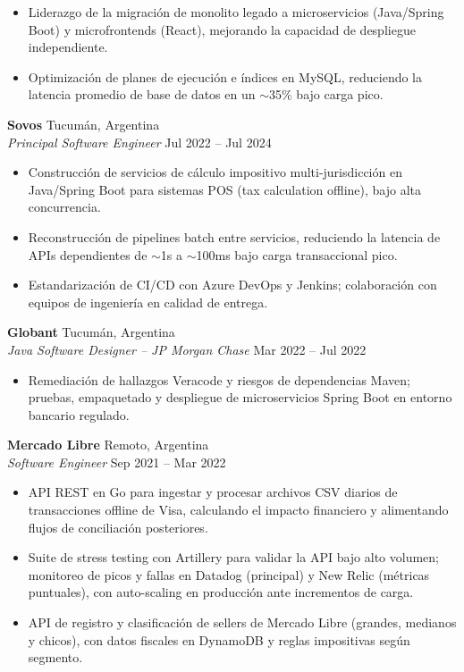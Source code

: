 \documentclass[11pt]{article}
\newcommand{\jobsep}{\vspace{8pt}}
\begin{document}
\begin{itemize}
    \item Liderazgo de la migración de monolito legado a microservicios (Java/Spring Boot) y microfrontends (React), mejorando la capacidad de despliegue independiente.
    \item Optimización de planes de ejecución e índices en MySQL, reduciendo la latencia promedio de base de datos en un $\sim$35\% bajo carga pico.
\end{itemize}

\jobsep

\textbf{Sovos} \hfill Tucumán, Argentina\\
\textit{Principal Software Engineer} \hfill Jul 2022 -- Jul 2024

\begin{itemize}
    \item Construcción de servicios de cálculo impositivo multi-jurisdicción en Java/Spring Boot para sistemas POS (tax calculation offline), bajo alta concurrencia.
    \item Reconstrucción de pipelines batch entre servicios, reduciendo la latencia de APIs dependientes de $\sim$1s a $\sim$100ms bajo carga transaccional pico.
    \item Estandarización de CI/CD con Azure DevOps y Jenkins; colaboración con equipos de ingeniería en calidad de entrega.
\end{itemize}

\jobsep

\textbf{Globant} \hfill Tucumán, Argentina\\
\textit{Java Software Designer -- JP Morgan Chase} \hfill Mar 2022 -- Jul 2022

\begin{itemize}
    \item Remediación de hallazgos Veracode y riesgos de dependencias Maven; pruebas, empaquetado y despliegue de microservicios Spring Boot en entorno bancario regulado.
\end{itemize}

\jobsep

\textbf{Mercado Libre} \hfill Remoto, Argentina\\
\textit{Software Engineer} \hfill Sep 2021 -- Mar 2022

\begin{itemize}
    \item API REST en Go para ingestar y procesar archivos CSV diarios de transacciones offline de Visa, calculando el impacto financiero y alimentando flujos de conciliación posteriores.
    \item Suite de stress testing con Artillery para validar la API bajo alto volumen; monitoreo de picos y fallas en Datadog (principal) y New Relic (métricas puntuales), con auto-scaling en producción ante incrementos de carga.
    \item API de registro y clasificación de sellers de Mercado Libre (grandes, medianos y chicos), con datos fiscales en DynamoDB y reglas impositivas según segmento.
\end{itemize}
\end{document}
